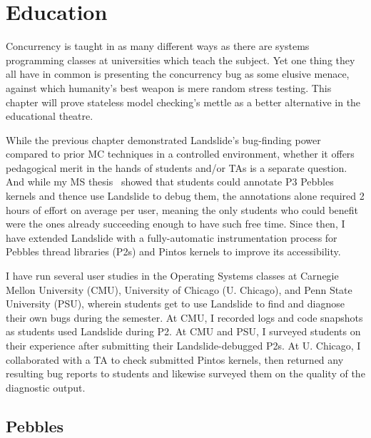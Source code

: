 \chapter{Education}
\label{chap:education}


Concurrency is taught in as many different ways as there are
systems programming classes at universities which teach the subject.
Yet one thing they all have in common is presenting the concurrency bug
as some elusive menace,
against which humanity's best weapon is mere random stress testing.
This chapter will prove stateless model checking's mettle as a better alternative in the educational theatre.

While the previous chapter demonstrated Landslide's bug-finding power
compared to prior MC techniques in a controlled environment,
whether it offers pedagogical merit in the hands of students and/or TAs is a separate question.
And while my MS thesis~\cite{landslide} showed that students
could annotate P3 Pebbles kernels and thence use Landslide to debug them,
the annotations alone required 2 hours of effort on average per user,
meaning the only students who could benefit were the ones already succeeding enough to have such free time.
Since then, I have extended Landslide with a fully-automatic instrumentation process
for Pebbles thread libraries (P2s) and Pintos kernels
to improve its accessibility.

I have run several user studies in the Operating Systems classes
at Carnegie Mellon University (CMU), University of Chicago (U. Chicago), and Penn State University (PSU),
wherein students get to use Landslide to find and diagnose their own bugs during the semester.
At CMU, I recorded logs and code snapshots as students used Landslide during P2.
At CMU and PSU, I surveyed students on their experience after submitting their Landslide-debugged P2s.
At U. Chicago, I collaborated with a TA to check submitted Pintos kernels,
then returned any resulting bug reports to students and likewise surveyed them on the quality of the diagnostic output.


\section{Pebbles}

